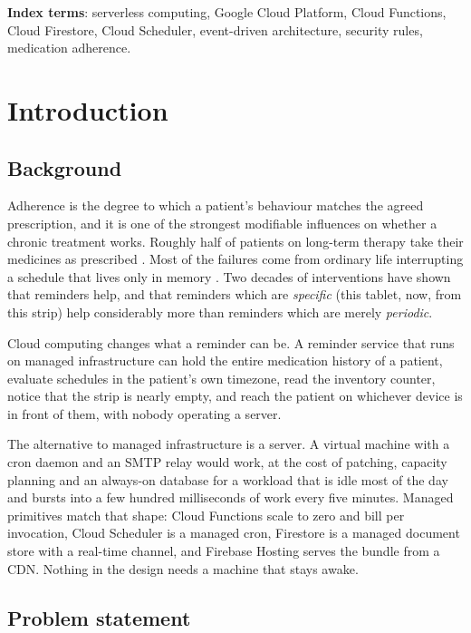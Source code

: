 \documentclass[11pt,a4paper]{report}
\begin{document}
\vspace{0.4cm}
\noindent\textbf{Index terms}: serverless computing, Google Cloud Platform, Cloud Functions, Cloud
Firestore, Cloud Scheduler, event-driven architecture, security rules, medication adherence.

\tableofcontents
\clearpage

\chapter{Introduction}

\section{Background}

Adherence is the degree to which a patient's behaviour matches the agreed prescription, and it is one of
the strongest modifiable influences on whether a chronic treatment works. Roughly half of patients on
long-term therapy take their medicines as prescribed \cite{osterberg2005}. Most of the failures come from ordinary life
interrupting a schedule that lives only in memory \cite{who2003,haynes2008}. Two decades
of interventions have shown that reminders help, and that reminders which are \emph{specific} (this
tablet, now, from this strip) help considerably more than reminders which are merely \emph{periodic}.

Cloud computing changes what a reminder can be. A reminder service that runs on managed infrastructure
can hold the entire medication history of a patient, evaluate schedules in the patient's own timezone,
read the inventory counter, notice that the strip is nearly empty, and reach the patient on whichever
device is in front of them, with nobody operating a server.

The alternative to managed infrastructure is a server. A virtual machine with a cron daemon and an SMTP
relay would work, at the cost of patching, capacity planning and an always-on database for a workload
that is idle most of the day and bursts into a few hundred milliseconds of work every five minutes.
Managed primitives match that shape: Cloud Functions scale to zero and bill per invocation, Cloud
Scheduler is a managed cron, Firestore is a managed document store with a real-time channel, and
Firebase Hosting serves the bundle from a CDN. Nothing in the design needs a machine that stays awake.

\section{Problem statement}
\end{document}
